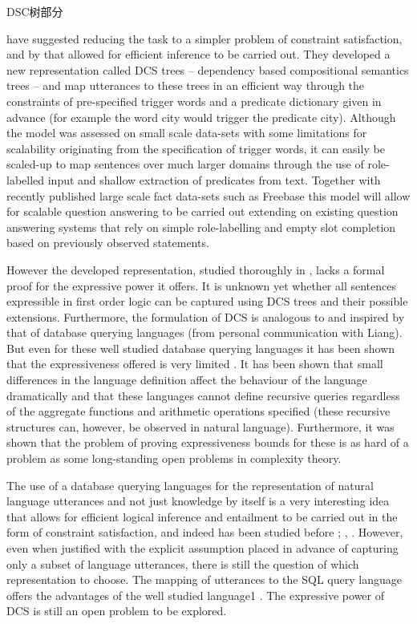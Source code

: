 
DSC树部分

\cite{Liang2013}have suggested reducing the task to a simpler
problem of constraint satisfaction, and by that allowed for efficient inference
to be carried out. They developed a new representation called DCS trees – dependency
based compositional semantics trees – and map utterances to these
trees in an efficient way through the constraints of pre-specified trigger words
and a predicate dictionary given in advance (for example the word city would
trigger the predicate city). Although the model was assessed on small scale
data-sets with some limitations for scalability originating from the specification
of trigger words, it can easily be scaled-up to map sentences over much larger
domains through the use of role-labelled input and shallow extraction of predicates
from text. Together with recently published large scale fact data-sets such
as Freebase\cite{Bollacker2008} this model
will allow for scalable question answering to be carried out extending on existing
question answering systems that rely on simple role-labelling and empty slot
completion based on previously observed statements.

However the developed representation, studied thoroughly in \cite{Liang2011},
lacks a formal proof for the expressive power it offers. It is unknown yet whether
all sentences expressible in first order logic can be captured using DCS trees and
their possible extensions. Furthermore, the formulation of DCS is analogous to
and inspired by that of database querying languages (from personal communication
with Liang). But even for these well studied database querying languages
it has been shown that the expressiveness offered is very limited \cite{Libkin2003}.
It has been shown that small differences in the language definition affect the
behaviour of the language dramatically and that these languages cannot define
recursive queries regardless of the aggregate functions and arithmetic operations
specified (these recursive structures can, however, be observed in natural language).
Furthermore, it was shown that the problem of proving expressiveness
bounds for these is as hard of a problem as some long-standing open problems
in complexity theory\cite{Libkin2003}.

The use of a database querying languages for the representation of natural language utterances and not just knowledge by itself is a very interesting idea that allows for efficient logical inference and entailment to be carried out in the form of constraint satisfaction, and indeed has been studied before
\cite{Giordani2010a}; 
\cite{Giordani2010b}, \cite{Giordani2009}. However, even when justified with the
explicit assumption placed in advance of capturing only a subset of language
utterances, there is still the question of which representation to choose. The
mapping of utterances to the SQL query language offers the advantages of the
well studied language1
. The expressive power of DCS is still an open problem
to be explored.


